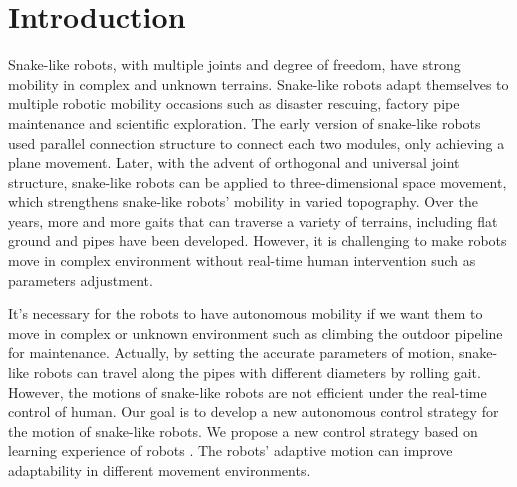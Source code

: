 \section{Introduction}
Snake-like robots, with multiple joints and degree of freedom, have strong mobility in complex and unknown terrains\cite{Chirikjian1995The}. Snake-like robots adapt themselves to multiple robotic mobility occasions such as disaster rescuing\cite{DogAndSnake}, factory pipe maintenance\cite{ACMTutorial} and scientific exploration\cite{Kuwada2007Snake}. The early version of snake-like robots used parallel connection structure to connect each two modules, only achieving a plane movement\cite{mori2002three}. Later, with the advent of orthogonal and universal joint structure\cite{1014757}\cite{Date2005Control}\cite{GaitBasedCompliant}, snake-like robots can be applied to three-dimensional space movement, which strengthens snake-like robots' mobility in varied topography. Over the years, more and more gaits that can traverse a variety of terrains, including flat ground and pipes have been developed\cite{5152862}\cite{5602354}. However, it is challenging to make robots move in complex environment without real-time human intervention such as parameters adjustment.

It's necessary for the robots to have autonomous mobility if we want them to move in complex or unknown environment such as climbing the outdoor pipeline for maintenance. Actually, by setting the accurate parameters of motion, snake-like robots can travel along the pipes with different diameters by rolling gait. However, the motions of snake-like robots are not efficient under the real-time control of human. Our goal is to develop a new autonomous control strategy for the motion of snake-like robots. We propose a new control strategy based on learning experience of robots . The robots' adaptive motion can improve adaptability in different movement environments.

